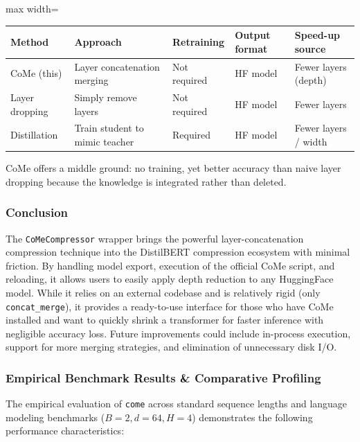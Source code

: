\begin{center}
\begin{adjustbox}{max width=\columnwidth}
\renewcommand{\arraystretch}{1.2}
\begin{tabular}{lllll}
\toprule
Method & Approach & Retraining & Output format & Speed-up source \\
\midrule
CoMe (this) & Layer concatenation merging & Not required & HF model & Fewer layers (depth) \\
Layer dropping & Simply remove layers & Not required & HF model & Fewer layers \\
Distillation & Train student to mimic teacher & Required & HF model & Fewer layers / width \\

\bottomrule
\end{tabular}
\end{adjustbox}
\end{center}
CoMe offers a middle ground: no training, yet better accuracy than naive layer dropping because the knowledge is integrated rather than deleted.


\subsubsection*{Conclusion}

The \texttt{CoMeCompressor} wrapper brings the powerful layer-concatenation compression technique into the DistilBERT compression ecosystem with minimal friction. By handling model export, execution of the official CoMe script, and reloading, it allows users to easily apply depth reduction to any HuggingFace model. While it relies on an external codebase and is relatively rigid (only \texttt{concat\_merge}), it provides a ready-to-use interface for those who have CoMe installed and want to quickly shrink a transformer for faster inference with negligible accuracy loss. Future improvements could include in-process execution, support for more merging strategies, and elimination of unnecessary disk I/O.

\subsubsection*{Empirical Benchmark Results \& Comparative Profiling}

The empirical evaluation of \texttt{come} across standard sequence lengths and language modeling benchmarks ($B=2, d=64, H=4$) demonstrates the following performance characteristics:

